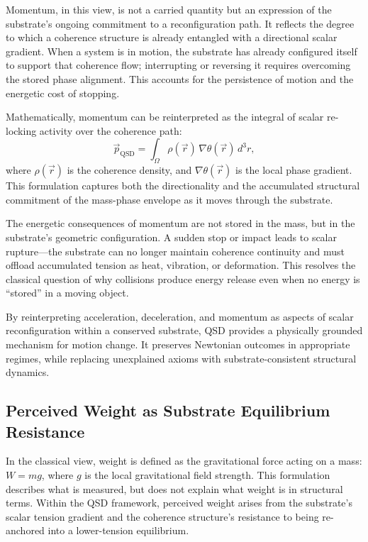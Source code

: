 \documentclass[entropy,article,submit,pdftex,moreauthors]{Definitions/mdpi}
\begin{document}
Momentum, in this view, is not a carried quantity but an expression of the substrate’s ongoing commitment to a reconfiguration path. It reflects the degree to which a coherence structure is already entangled with a directional scalar gradient. When a system is in motion, the substrate has already configured itself to support that coherence flow; interrupting or reversing it requires overcoming the stored phase alignment. This accounts for the persistence of motion and the energetic cost of stopping.

Mathematically, momentum can be reinterpreted as the integral of scalar re-locking activity over the coherence path:
\[
\vec{p}_{\text{QSD}} = \int_{\Omega} \rho(\vec{r}) \, \nabla \theta(\vec{r}) \, d^3r,
\]
where \( \rho(\vec{r}) \) is the coherence density, and \( \nabla \theta(\vec{r}) \) is the local phase gradient. This formulation captures both the directionality and the accumulated structural commitment of the mass-phase envelope as it moves through the substrate.

The energetic consequences of momentum are not stored in the mass, but in the substrate's geometric configuration. A sudden stop or impact leads to scalar rupture---the substrate can no longer maintain coherence continuity and must offload accumulated tension as heat, vibration, or deformation. This resolves the classical question of why collisions produce energy release even when no energy is “stored” in a moving object.

By reinterpreting acceleration, deceleration, and momentum as aspects of scalar reconfiguration within a conserved substrate, QSD provides a physically grounded mechanism for motion change. It preserves Newtonian outcomes in appropriate regimes, while replacing unexplained axioms with substrate-consistent structural dynamics.
\subsection{Perceived Weight as Substrate Equilibrium Resistance}

In the classical view, weight is defined as the gravitational force acting on a mass: \( W = mg \), where \( g \) is the local gravitational field strength. This formulation describes what is measured, but does not explain what weight is in structural terms. Within the QSD framework, perceived weight arises from the substrate’s scalar tension gradient and the coherence structure’s resistance to being re-anchored into a lower-tension equilibrium.
\end{document}
